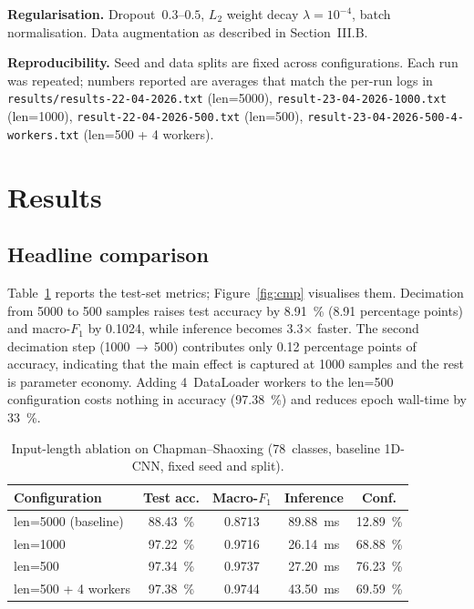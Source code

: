 \documentclass[conference]{IEEEtran}
\begin{document}
\textbf{Regularisation.} Dropout~$0.3$--$0.5$, $L_2$ weight decay
$\lambda=10^{-4}$, batch normalisation. Data augmentation as described
in Section~III.B.

\textbf{Reproducibility.} Seed and data splits are fixed across
configurations. Each run was repeated; numbers reported are averages
that match the per-run logs in
\texttt{results/results-22-04-2026.txt} (len=\num{5000}),
\texttt{result-23-04-2026-1000.txt} (len=\num{1000}),
\texttt{result-22-04-2026-500.txt} (len=\num{500}),
\texttt{result-23-04-2026-500-4-workers.txt} (len=\num{500} + 4 workers).

\section{Results}
\label{sec:results}

\subsection{Headline comparison}
Table~\ref{tab:main} reports the test-set metrics; Figure~\ref{fig:cmp}
visualises them. Decimation from \num{5000} to \num{500} samples raises
test accuracy by \SI{8.91}{\percent} (\num{8.91} percentage points)
and macro-$F_1$ by \num{0.1024}, while inference becomes
3.3$\times$ faster. The second decimation step
(\num{1000}\,$\rightarrow$\,\num{500}) contributes only
\num{0.12} percentage points of accuracy, indicating that the main
effect is captured at \num{1000} samples and the rest is parameter
economy. Adding 4~DataLoader workers to the len=\num{500} configuration
costs nothing in accuracy (\SI{97.38}{\percent}) and reduces epoch
wall-time by \SI{33}{\percent}.

\begin{table}[t]
\caption{Input-length ablation on Chapman--Shaoxing
(\num{78}~classes, baseline 1D-CNN, fixed seed and split).}
\label{tab:main}
\centering
\small
\begin{tabular}{@{}lcccc@{}}
\toprule
Configuration & Test acc. & Macro-$F_1$ & Inference & Conf. \\
\midrule
len=\num{5000} (baseline) & \SI{88.43}{\percent} & 0.8713 & \SI{89.88}{\milli\second} & \SI{12.89}{\percent} \\
len=\num{1000}            & \SI{97.22}{\percent} & 0.9716 & \SI{26.14}{\milli\second} & \SI{68.88}{\percent} \\
len=\num{500}             & \SI{97.34}{\percent} & 0.9737 & \SI{27.20}{\milli\second} & \SI{76.23}{\percent} \\
len=\num{500} + 4 workers & \SI{97.38}{\percent} & 0.9744 & \SI{43.50}{\milli\second} & \SI{69.59}{\percent} \\
\bottomrule
\end{tabular}
\end{table}
\end{document}
